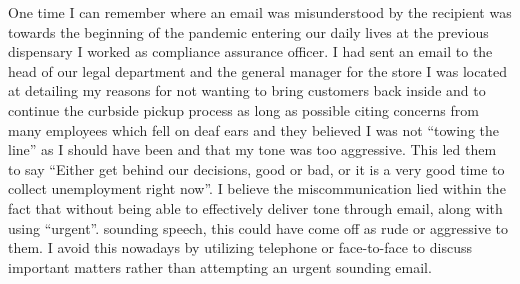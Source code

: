 \documentclass[stu,12pt]{apa7}
\begin{document}
      One time I can remember where an email was misunderstood by the recipient
        was towards the beginning of the pandemic entering our daily lives at
        the previous dispensary I worked as compliance assurance officer. I had
        sent an email to the head of our legal department and the general
        manager for the store I was located at detailing my reasons for not
        wanting to bring customers back inside and to continue the curbside
        pickup process as long as possible citing concerns from many employees
        which fell on deaf ears and they believed I was not ``towing the line''
        as I should have been and that my tone was too aggressive. This led them
        to say ``Either get behind our decisions, good or bad, or it is a very
        good time to collect unemployment right now''. I believe the
        miscommunication lied within the fact that without being able to
        effectively deliver tone through email, along with using ``urgent''.
        sounding speech, this could have come off as rude or aggressive to them.
        I avoid this nowadays by utilizing telephone or face-to-face to discuss
        important matters rather than attempting an urgent sounding email.



\end{document}
